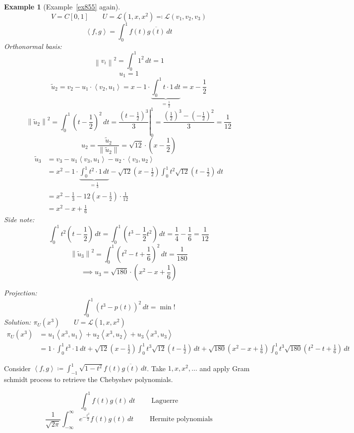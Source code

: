 \documentclass{article}
\newtheorem{example}{Example}  \numberwithin{example}{section}
\newcommand{\ip}[2]{\left\langle#1,#2\right\rangle} %
\newcommand{\norm}[1]{\left\|#1\right\|}
\begin{document}
\begin{example}[Example~\ref{ex855} again] %
  \[ V = C[0,1] \qquad U = \mathcal L(1, x, x^2) \eqqcolon \mathcal L(v_1, v_2, v_3) \]
  \[ \ip fg = \int_0^1 f(t) \overline{g(t)} \, dt \]
  Orthonormal basis:
  \[ \norm{v_i}^2 = \int_0^1 1^2 \, dt = 1 \]
  \[ u_1 = 1 \]
  \[ \tilde u_2 = v_2 - u_1 \cdot \ip{v_2}{u_1} = x - 1 \cdot \underbrace{\int_0^1 t \cdot 1 \, dt}_{= \frac12} = x - \frac12 \]
  \[ \norm{\tilde u_2}^2 = \int_0^1 (t - \frac12)^2 \, dt = \left.\frac{(t - \frac12)^3}{3} \right|_0^1 = \frac{(\frac12)^3 - (-\frac12)^2}{3} = \frac1{12} \]
  \[ u_2 = \frac{\tilde u_2}{\norm{\tilde u_2}} = \sqrt{12} \cdot (x - \frac12) \]
  \begin{align*}
    \tilde u_3 &= v_3 - u_1 \ip{v_3}{u_1} - u_2 \cdot \ip{v_3}{u_2} \\
      &= x^2 - 1 \cdot \underbrace{\int_0^1 t^2 \cdot 1 \, dt}_{= \frac13} - \sqrt{12} (x - \frac12) \int_0^1 t^2 \sqrt{12} (t - \frac12) \, dt \\
      &= x^2 - \frac13 - 12 (x - \frac12) \cdot \frac1{12} \\
      &= x^2 - x + \frac16
  \end{align*}
  Side note:
  \[ \int_0^1 t^2 (t - \frac12) \, dt = \int_0^1 (t^3 - \frac12 t^2) \, dt = \frac14 - \frac16 = \frac1{12} \]
  \[ \norm{\tilde u_3}^2 = \int_0^1 (t^2 - t + \frac16)^2 \, dt = \frac1{180} \]
  \[ \implies u_3 = \sqrt{180} \cdot (x^2 - x + \frac16) \]

  Projection:
  \[ \int_0^1 (t^3 - p(t))^2 \, dt = \operatorname{min}! \]
  Solution: $\pi_U(x^3) \qquad U = \mathcal L(1, x, x^2)$
  \begin{align*}
    \pi_U(x^3) &= u_1 \ip{x^3}{u_1} + u_2 \ip{x^3}{u_2} + u_3 \ip{x^3}{u_3} \\
      &= 1 \cdot \int_0^1  t^3 \cdot 1 \, dt + \sqrt{12} (x - \frac12) \int_0^1 t^3 \sqrt{12} (t - \frac12) \, dt + \sqrt{180} (x^2 - x + \frac16) \int_0^1 t^3 \sqrt{180} (t^2 - t + \frac16) \, dt
  \end{align*}
\end{example}

Consider $\ip fg \coloneqq \int_{-1}^1 \sqrt{1 - t^2} f(t) \overline{g(t)} \, dt$.
Take $1, x, x^2, \ldots$ and apply Gram schmidt process to retrieve the Chebyshev polynomials.

\[ \int_0^1 f(t) g(t) \, dt \qquad \text{ Laguerre} \]
\[ \frac1{\sqrt{2\pi}} \int_{-\infty}^\infty e^{-\frac{t^2}{2}}  f(t) g(t) \, dt \qquad \text{ Hermite polynomials} \]
\end{document}
